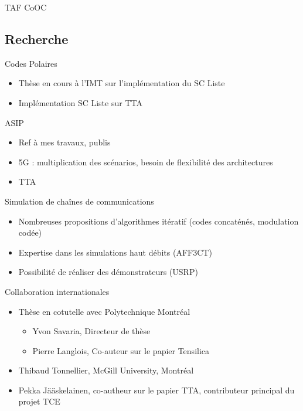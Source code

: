 \documentclass[t,compress,mathserif,12pt,xcolor=dvipsnames]{beamer}
\begin{document}
\begin{frame}[c]{TAF CoOC}

\end{frame}
\subsection{Recherche}
\begin{frame}[c]{Codes Polaires}
  \begin{itemize}
    \item Thèse en cours à l'IMT sur l'implémentation du SC Liste
    \item Implémentation SC Liste sur TTA
  \end{itemize}
\end{frame}
\begin{frame}[c]{ASIP}
  \begin{itemize}
    \item Ref à mes travaux, publis
    \item 5G : multiplication des scénarios, besoin de flexibilité des architectures
    \item TTA
    \end{itemize}
\end{frame}
\begin{frame}[c]{Simulation de chaînes de communications}
  \begin{itemize}
    \item Nombreuses propositions d'algorithmes itératif (codes concaténés, modulation codée)
    \item Expertise dans les simulations haut débits (AFF3CT)
    \item Possibilité de réaliser des démonstrateurs (USRP)

  \end{itemize}
\end{frame}
\begin{frame}[c]{Collaboration internationales}
  \begin{itemize}
    \item Thèse en cotutelle avec Polytechnique Montréal
    \begin{itemize}
    \item Yvon Savaria, Directeur de thèse
    \item Pierre Langlois, Co-auteur sur le papier Tensilica
    \end{itemize}
    \item Thibaud Tonnellier, McGill University, Montréal
    \item Pekka Jääskelainen, co-autheur sur le papier TTA, contributeur principal du projet TCE
  \end{itemize}
\end{frame}
\end{document}
